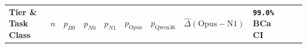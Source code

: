 \documentclass[10pt,letterpaper]{article}
\newcounter{none}
\begin{document}
{\def\LTcaptype{none} %
{\scriptsize\setlength{\tabcolsep}{2.4pt}\renewcommand{\arraystretch}{1.12}
\begin{longtable}[]{@{}
  >{\raggedright\arraybackslash}p{}
  >{\raggedleft\arraybackslash}p{}
  >{\raggedleft\arraybackslash}p{}
  >{\raggedleft\arraybackslash}p{}
  >{\raggedleft\arraybackslash}p{}
  >{\raggedleft\arraybackslash}p{}
  >{\raggedleft\arraybackslash}p{}
  >{\raggedleft\arraybackslash}p{}
  >{\centering\arraybackslash}p{}
  >{\raggedleft\arraybackslash}p{}
  >{\raggedright\arraybackslash}p{}@{}}
\toprule\noalign{}
\begin{minipage}[b]{\linewidth}\raggedright
\textbf{Tier \& Task Class}
\end{minipage} & \begin{minipage}[b]{\linewidth}\raggedleft
\textbf{\(n\)}
\end{minipage} & \begin{minipage}[b]{\linewidth}\raggedleft
\textbf{\(p_{B0}\)}
\end{minipage} & \begin{minipage}[b]{\linewidth}\raggedleft
\textbf{\(p_{N0}\)}
\end{minipage} & \begin{minipage}[b]{\linewidth}\raggedleft
\textbf{\(p_{N1}\)}
\end{minipage} & \begin{minipage}[b]{\linewidth}\raggedleft
\textbf{\(p_{\text{Opus}}\)}
\end{minipage} & \begin{minipage}[b]{\linewidth}\raggedleft
\textbf{\(p_{\text{Qwen36}}\)}
\end{minipage} & \begin{minipage}[b]{\linewidth}\raggedleft
\textbf{\(\hat{\Delta}(\text{Opus}-\text{N1})\)}
\end{minipage} & \begin{minipage}[b]{\linewidth}\centering
\textbf{\texttt{99.0\%} BCa CI}
\end{minipage} & \begin{minipage}[b]{\linewidth}\raggedleft

\end{minipage}
\end{longtable}}}
\end{document}
